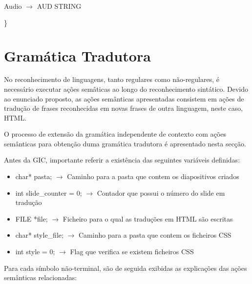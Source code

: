 \documentclass[11pt,a4paper]{report}
\begin{document}
\vspace{0.2cm}
\hspace{1.0cm} Audio $\rightarrow$ AUD STRING


\hspace{0.7cm} \}


\section{Gramática Tradutora}

No reconhecimento de linguagens, tanto regulares como não-regulares, é necessário executar ações semâticas ao longo do reconhecimento sintático. Devido ao enunciado proposto, as ações semânticas apresentadas consistem em ações de tradução de frases reconhecidas em novas frases de outra linguagem, neste caso, HTML.

O processo de extensão da gramática independente de contexto com ações semânticas para obtenção duma gramática tradutora é apresentado nesta secção.

Antes da GIC, importante referir a existência das seguintes variáveis definidas:

\begin{itemize}
	\item char* pasta; $\rightarrow$ Caminho para a pasta que contem os diapositivos criados
	\item int slide\_counter = 0; $\rightarrow$ Contador que possui o número do slide em tradução
	\item FILE *file; $\rightarrow$ Ficheiro para o qual as traduções em HTML são escritas
	\item char* style\_file; $\rightarrow$ Caminho para a pasta que contem os ficheiros CSS
	\item int style = 0; $\rightarrow$ Flag que verifica se existem ficheiros CSS
\end{itemize}


Para cada símbolo não-terminal, são de seguida exibidas as explicações das ações semânticas relacionadas:
\end{document}
